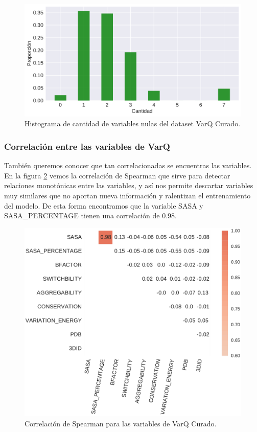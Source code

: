 \begin{figure}[H]
    \centering
    \includegraphics[scale=0.55]{documents/latex/figures/3/varq/nulos_varq.pdf}
    \caption{Histograma de cantidad de variables nulas del dataset VarQ Curado.}
    \label{fig:nulos_varq}
\end{figure}



\subsubsection{Correlación entre las variables de VarQ}

También queremos conocer que tan correlacionadas se encuentras las variables. En la figura \ref{fig:varq_corrplot} vemos la correlación de Spearman que sirve para detectar relaciones monotónicas entre las variables, y así nos permite descartar variables muy similares que no aportan nueva información y ralentizan el entrenamiento del modelo. De esta forma encontramos que la variable SASA y SASA\_PERCENTAGE tienen una correlación de 0.98.

\begin{figure}[H]
    \centering
    \includegraphics[scale=0.8]{documents/latex/figures/3/varq/varq_corrplot.pdf}
    \caption{Correlación de Spearman para las variables de VarQ Curado.}
    \label{fig:varq_corrplot}
\end{figure}

